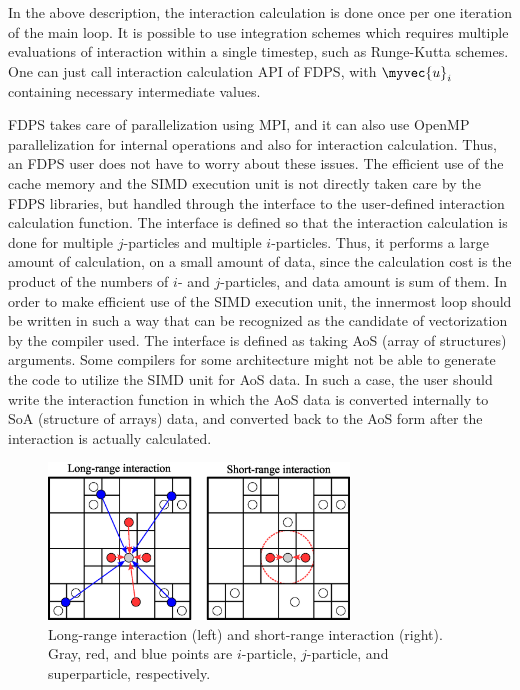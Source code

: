 In the above description, the interaction calculation is done once per
one iteration of the main loop. It is possible to use integration
schemes which requires multiple evaluations of interaction within a
single timestep, such as Runge-Kutta schemes. One can just call
interaction calculation API of FDPS, with $\myvec{u}_i$ containing
necessary intermediate values.

FDPS takes care of parallelization using MPI, and it can also use
OpenMP parallelization for internal operations and also for
interaction calculation. Thus, an FDPS user does not have to worry
about these issues. The efficient use of the cache memory and the SIMD
execution unit is not directly taken care by the FDPS libraries, but
handled through the interface to the user-defined interaction
calculation function. The interface is defined so that the interaction
calculation is done for multiple $j$-particles and multiple
$i$-particles. Thus, it performs a large amount of calculation, on a
small amount of data, since the calculation cost is the product of the
numbers of $i$- and $j$-particles, and data amount is sum of them.  In
order to make efficient use of the SIMD execution unit, the innermost
loop should be written in such a way that can be recognized as the
candidate of vectorization by the compiler used. The interface is
defined as taking AoS (array of structures) arguments.  Some compilers
for some architecture might not be able to generate the code to
utilize the SIMD unit for AoS data. In such a case, the user should
write the interaction function in which the AoS data is converted
internally to SoA (structure of arrays) data, and converted back to
the AoS form after the interaction is actually calculated.

\begin{figure}
  \begin{center}
    \includegraphics[width=8cm]{fig/force_type.eps}
  \end{center}
  \caption{Long-range interaction (left) and short-range interaction
    (right). Gray, red, and blue points are $i$-particle,
    $j$-particle, and superparticle, respectively.}
  \label{fig:forcetype}
\end{figure}

